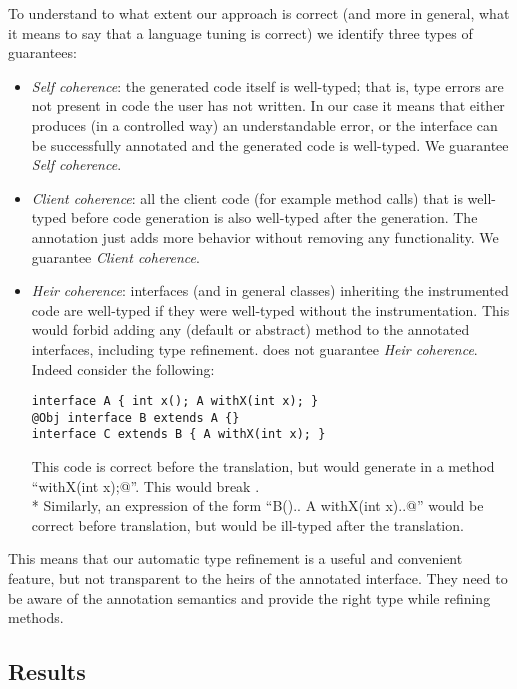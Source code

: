 To understand to what extent our approach is correct (and more in general, what it means to say that a language tuning is correct) we identify three types of guarantees:
\begin{itemize}
\item \textit{Self coherence}: the generated code itself is well-typed; that is,
  type errors are not present in code the user has not written.
In our case it means that either \mixin{} produces (in a controlled way) an
understandable error, or the interface can be successfully annotated and the generated code is well-typed.
We guarantee \textit{Self coherence}.

\item \textit{Client coherence}: all the client code (for example method calls)
  that is well-typed before code generation is also well-typed after the generation.
The annotation just adds more behavior without removing any functionality.
We guarantee \textit{Client coherence}.

\item \textit{Heir coherence}: interfaces (and in general classes) inheriting the instrumented code are well-typed if they were well-typed without the instrumentation.
This would forbid adding any (default or abstract) method to the annotated interfaces, including type refinement.
\mixin  does not guarantee \textit{Heir coherence}.
Indeed consider the following:

\begin{lstlisting}
interface A { int x(); A withX(int x); }
@Obj interface B extends A {}
interface C extends B { A withX(int x); }
\end{lstlisting}

\noindent This code is correct before the translation, but \mixin would  generate in \Q@B@  a method ``\Q@B withX(int x);@''.
This would break \Q@C@. \\*
Similarly, an expression of the form ``\Q@new B(){.. A withX(int x){..}}@''
would be correct before translation, but would be ill-typed after the translation.
\end{itemize}

\noindent This means that our automatic type refinement
is a useful and convenient feature, but not transparent to the heirs of the annotated interface. They need to be aware of the annotation semantics and provide the right type while refining methods.

\subsection{Results}

